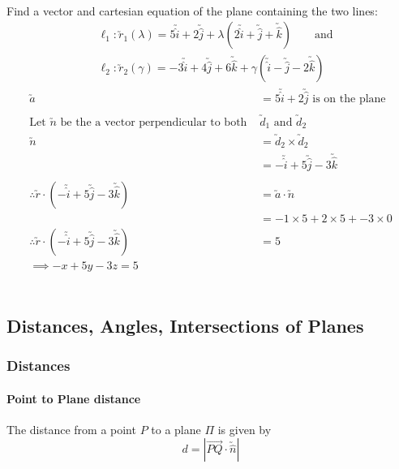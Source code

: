 \documentclass[a4paper,twoside]{article}
\newenvironment{example}[1]{%
	\mbox{}\\\tcolorbox[beamer,breakable,%
		title=Example: #1,standard jigsaw,opacityback=0, colframe=blue!75!black]}{\endtcolorbox\mbox{}\\}
\begin{document}
			\begin{example}{Equation of Plane Given 2 Intersecting Lines}
				Find a vector and cartesian equation of the plane containing the two lines:
				\begin{align*}
					&\ell_1: \utilde{r}_1(\lambda)=5\utilde{\hat{i}}+2\utilde{\hat{j}}+\lambda\left(2\utilde{\hat{i}}+\utilde{\hat{j}}+\utilde{\hat{k}}\right) \qquad \text{and} \\ &
					\ell_2: \utilde{r}_2(\gamma)=-3\utilde{\hat{i}}+4\utilde{\hat{j}}+6\utilde{\hat{k}}+\gamma\left(\utilde{\hat{i}}-\utilde{\hat{j}}-2\utilde{\hat{k}}\right)
				\end{align*}
				\begin{align*}
					\utilde{a}&=5\utilde{\hat{i}}+2\utilde{\hat{j}}\text{ is on the plane} \\
					\\
					\text{Let $\utilde{n}$ be the a vector perpendicular to both } & \text{$\utilde{d}_1$ and $\utilde{d}_2$} \\
					\utilde{n}&=\utilde{d}_2\times\utilde{d}_2 \\
					&=-\utilde{\hat{i}}+5\utilde{\hat{j}}-3\utilde{\hat{k}} \\
					\\
					\therefore \utilde{r}\cdot\left(-\utilde{\hat{i}}+5\utilde{\hat{j}}-3\utilde{\hat{k}}\right)&=\utilde{a}\cdot\utilde{n}\\
					&=-1\times5+2\times5+-3\times0 \\
					\therefore\utilde{r}\cdot\left(-\utilde{\hat{i}}+5\utilde{\hat{j}}-3\utilde{\hat{k}}\right)&=5 \\
					\implies -x+5y-3z=5
				\end{align*}
			\end{example}
		\subsection{Distances, Angles, Intersections of Planes}
			\subsubsection{Distances}
				\paragraph{Point to Plane distance} The distance from a point $P$ to a plane $\Pi$ is given by
				\[
					d=\left|\overrightarrow{PQ}\cdot\utilde{\hat{n}}\right|
				\]
				
\end{document}
